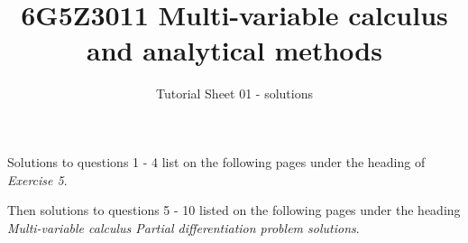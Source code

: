 \documentclass[a4paper]{amsart}
\begin{document}
\title{6G5Z3011 Multi-variable calculus and analytical methods}
\author{Tutorial Sheet 01 - solutions}
\maketitle

Solutions to questions 1 - 4 list on the following pages under the heading of \textit{Exercise 5}.

Then solutions to questions 5 - 10 listed on the following pages under the heading \textit{Multi-variable calculus  Partial differentiation problem solutions}. 


\end{document}
